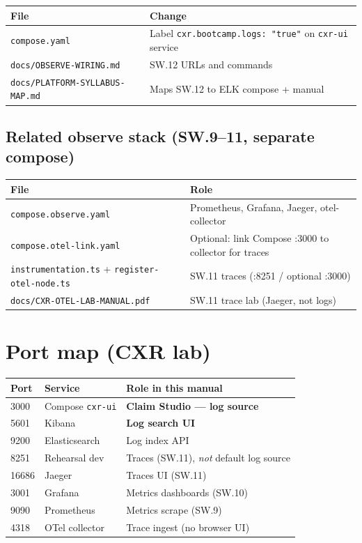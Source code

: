 \documentclass[11pt,a4paper]{report}
\begin{document}
\begin{longtable}{@{}p{4.8cm}p{8.2cm}@{}}
\toprule
File & Change \\
\midrule
\endhead
\texttt{compose.yaml} & Label \texttt{cxr.bootcamp.logs: "true"} on \texttt{cxr-ui} service \\
\texttt{docs/OBSERVE-WIRING.md} & SW.12 URLs and commands \\
\texttt{docs/PLATFORM-SYLLABUS-MAP.md} & Maps SW.12 to ELK compose + manual \\
\end{longtable}

\section{Related observe stack (SW.9--11, separate compose)}

\begin{longtable}{@{}p{4.8cm}p{8.2cm}@{}}
\toprule
File & Role \\
\midrule
\endhead
\texttt{compose.observe.yaml} & Prometheus, Grafana, Jaeger, otel-collector \\
\texttt{compose.otel-link.yaml} & Optional: link Compose :3000 to collector for traces \\
\texttt{instrumentation.ts} + \texttt{register-otel-node.ts} & SW.11 traces (:8251 / optional :3000) \\
\texttt{docs/CXR-OTEL-LAB-MANUAL.pdf} & SW.11 trace lab (Jaeger, not logs) \\
\end{longtable}

\chapter{Port map (CXR lab)}

\begin{center}
\begin{tabular}{lll}
\toprule
Port & Service & Role in this manual \\
\midrule
3000 & Compose \texttt{cxr-ui} & \textbf{Claim Studio --- log source} \\
5601 & Kibana & \textbf{Log search UI} \\
9200 & Elasticsearch & Log index API \\
8251 & Rehearsal dev & Traces (SW.11), \emph{not} default log source \\
16686 & Jaeger & Traces UI (SW.11) \\
3001 & Grafana & Metrics dashboards (SW.10) \\
9090 & Prometheus & Metrics scrape (SW.9) \\
4318 & OTel collector & Trace ingest (no browser UI) \\
\bottomrule
\end{tabular}
\end{center}
\end{document}
